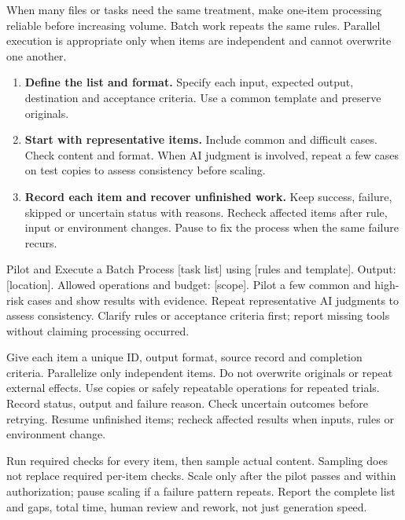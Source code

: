 When many files or tasks need the same treatment, make one-item processing reliable before increasing volume. Batch work repeats the same rules. Parallel execution is appropriate only when items are independent and cannot overwrite one another.
\begin{enumerate}
\item \textbf{Define the list and format.} Specify each input, expected output, destination and acceptance criteria. Use a common template and preserve originals.
\item \textbf{Start with representative items.} Include common and difficult cases. Check content and format. When AI judgment is involved, repeat a few cases on test copies to assess consistency before scaling.
\item \textbf{Record each item and recover unfinished work.} Keep success, failure, skipped or uncertain status with reasons. Recheck affected items after rule, input or environment changes. Pause to fix the process when the same failure recurs.
\end{enumerate}
\begin{prompt}{Pilot and Execute a Batch}
Process [task list] using [rules and template]. Output: [location]. Allowed operations and budget: [scope]. Pilot a few common and high-risk cases and show results with evidence. Repeat representative AI judgments to assess consistency. Clarify rules or acceptance criteria first; report missing tools without claiming processing occurred.\par
Give each item a unique ID, output format, source record and completion criteria. Parallelize only independent items. Do not overwrite originals or repeat external effects. Use copies or safely repeatable operations for repeated trials. Record status, output and failure reason. Check uncertain outcomes before retrying. Resume unfinished items; recheck affected results when inputs, rules or environment change.\par
Run required checks for every item, then sample actual content. Sampling does not replace required per-item checks. Scale only after the pilot passes and within authorization; pause scaling if a failure pattern repeats. Report the complete list and gaps, total time, human review and rework, not just generation speed.
\end{prompt}
